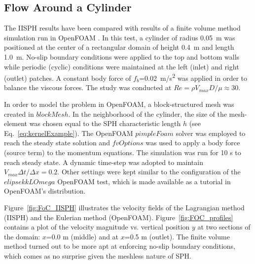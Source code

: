 %		
%	

\subsection{Flow Around a Cylinder}
The IISPH results have been compared with results of a finite volume method simulation run in OpenFOAM \cite{weller1998tensorial}. In this test, a cylinder of radius 0.05~\si{m} was positioned at the center of a rectangular domain of height 0.4~\si{m} and length 1.0~\si{m}. No-slip boundary conditions were applied to the top and bottom walls while periodic (cyclic) conditions were maintained at the left (inlet) and right (outlet) patches. A constant body force of $f_b$=0.02~\si{m/s^2} was applied in order to balance the viscous forces. The study was conducted at $Re={\rho V_{max} D}/{\mu}\approx 30 $.

In order to model the problem in OpenFOAM, a block-structured mesh was created in $blockMesh$. In the neighborhood of the cylinder, the size of the mesh-element was chosen equal to the SPH characteristic length $h$ (see Eq.~\ref{eq:kernelExample}). The OpenFOAM $pimpleFoam$ solver was employed to reach the steady state solution and $fvOptions$ was used to apply a body force (source term) to the momentum equations. The simulation was run for 10 \si{s} to reach steady state. A dynamic time-step was adopted to maintain ${V_{max}\Delta t}/{\Delta x} =0.2$. Other settings were kept similar to the configuration of the $elipsekkLOmega$ OpenFOAM test, which is made available as a tutorial in OpenFOAM's distribution.

Figure~\ref{fig:FoC_IISPH} illustrates the velocity fields of the Lagrangian method (IISPH) and the Eulerian method (OpenFOAM). Figure~\ref{fig:FOC_profiles} contains a plot of the velocity magnitude vs. vertical position $y$ at two sections of the domain: $x$=0.0 \si{m} (middle) and at $x$=0.5 \si{m} (outlet). The finite volume method turned out to be more apt at enforcing no-slip boundary conditions, which comes as no surprise given the meshless nature of SPH.

